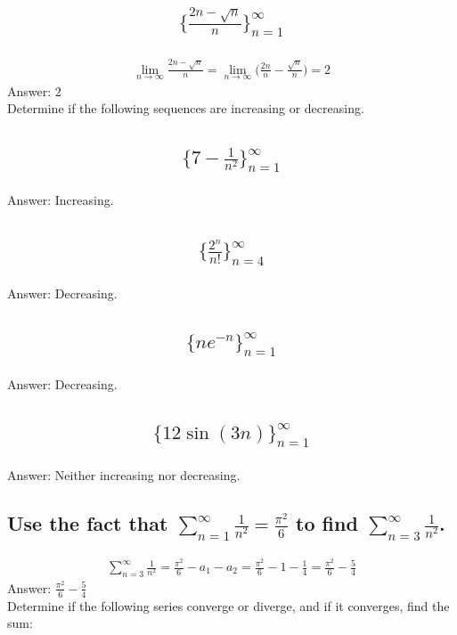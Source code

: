 \documentclass{article}
\begin{document}
\subsection{
	\begin{align*}
    		\biggl\{ \frac{2n - \sqrt{n}}{n} \biggl\}_{n = 1}^{\infty}
	\end{align*}
}
\begin{align*}
	\lim_{n \to \infty} {\frac{2n - \sqrt{n}}{n}} = \lim_{n \to \infty} \bigg( \frac{2n}{n} - \frac{\sqrt{n}}{n} \bigg)= 2
\end{align*}
Answer: $2$ \\[10pt]
Determine if the following sequences are increasing or decreasing.
\subsection{
	\begin{align*}
    		\biggl\{ 7 - \frac{1}{n^2} \biggl\}_{n = 1}^{\infty}
	\end{align*}
}
Answer: Increasing.

\subsection{
	\begin{align*}
    		\biggl\{ \frac{2^n}{n!} \biggl\}_{n = 4}^{\infty}
	\end{align*}
}
Answer: Decreasing.

\subsection{
	\begin{align*}
    		\{n e^{-n} \}_{n = 1}^{\infty}
	\end{align*}
}
Answer: Decreasing.

\subsection{
	\begin{align*}
    		\{ 12 \sin{(3n)} \}_{n = 1}^{\infty}
	\end{align*}
}
Answer: Neither increasing nor decreasing.

\subsection{Use the fact that $\sum_{n = 1}^{\infty} \frac{1}{n^2} = \frac{\pi^2}{6}$ to find $\sum_{n = 3}^{\infty} \frac{1}{n^2}$.}
\begin{align*}
	\sum_{n = 3}^{\infty} \frac{1}{n^2} = \frac{\pi^2}{6} - a_1 - a_2 = \frac{\pi^2}{6} - 1 - \frac{1}{4} = \frac{\pi^2}{6} - \frac{5}{4}
\end{align*}
Answer: $\frac{\pi^2}{6} - \frac{5}{4}$ \\[10pt]
Determine if the following series converge or diverge, and if it converges, find the sum:
\end{document}
